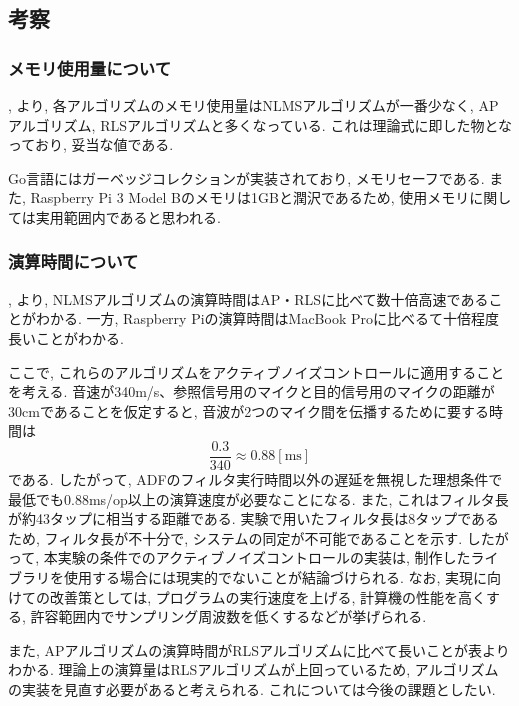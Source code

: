 \subsection{考察}

\subsubsection{メモリ使用量について}\label{about-memory}

, より, 各アルゴリズムのメモリ使用量はNLMSアルゴリズムが一番少なく, APアルゴリズム, RLSアルゴリズムと多くなっている. これは理論式に即した物となっており, 妥当な値である. 

Go言語にはガーベッジコレクションが実装されており, メモリセーフである. また, Raspberry
Pi 3 Model
Bのメモリは1GBと潤沢であるため, 使用メモリに関しては実用範囲内であると思われる. 

\subsubsection{演算時間について}\label{about-time}

, より, NLMSアルゴリズムの演算時間はAP・RLSに比べて数十倍高速であることがわかる. 一方, Raspberry Piの演算時間はMacBook Proに比べるて十倍程度長いことがわかる. 

ここで, これらのアルゴリズムをアクティブノイズコントロールに適用することを考える. 
音速が340m/s、参照信号用のマイクと目的信号用のマイクの距離が30cmであることを仮定すると, 音波が2つのマイク間を伝播するために要する時間は
\begin{equation}
  \frac{0.3}{340} \approx 0.88 [\si{\milli \second}]
\end{equation}
である. したがって, ADFのフィルタ実行時間以外の遅延を無視した理想条件で最低でも0.88ms/op以上の演算速度が必要なことになる. 
また, これはフィルタ長が約43タップに相当する距離である. 実験で用いたフィルタ長は8タップであるため, フィルタ長が不十分で, システムの同定が不可能であることを示す. 
したがって, 本実験の条件でのアクティブノイズコントロールの実装は, 制作したライブラリを使用する場合には現実的でないことが結論づけられる. 
なお, 実現に向けての改善策としては, プログラムの実行速度を上げる, 計算機の性能を高くする, 許容範囲内でサンプリング周波数を低くするなどが挙げられる. 


また, APアルゴリズムの演算時間がRLSアルゴリズムに比べて長いことが表よりわかる. 理論上の演算量はRLSアルゴリズムが上回っているため, アルゴリズムの実装を見直す必要があると考えられる. これについては今後の課題としたい. 